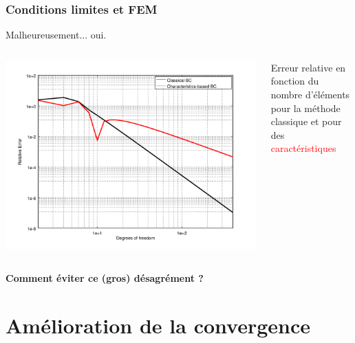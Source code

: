 \documentclass[10pt, compress]{beamer}
\begin{document}
\begin{frame}
	\frametitle{Conditions limites et FEM}
	\begin{block}{Malheureusement... oui.}
		\begin{columns}[onlytextwidth]
            \begin{column}{0.6\textwidth}
                \includegraphics[width=\textwidth]{../report/part3/figs/convergence.png}
            \end{column}
            \begin{column}{0.4\textwidth}
            \footnotesize{Erreur relative en fonction du nombre d'éléments\\
            pour la méthode classique et pour des \textcolor{red}{caractéristiques}}
            \end{column}
		\end{columns}
	\end{block}

	\pause

	\begin{center}
		\alert{\textbf{
		Comment éviter ce (gros) désagrément ?
		}}
	\end{center}
\end{frame}


\section{Amélioration de la convergence}
\end{document}
